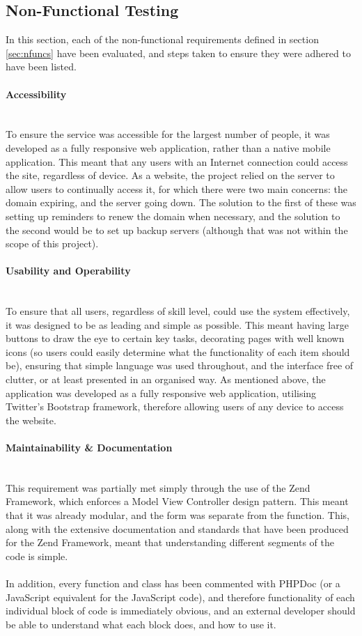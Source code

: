 \newpage 
\subsection{Non-Functional Testing}
In this section, each of the non-functional requirements defined in section \ref{sec:nfuncs} have been evaluated, and steps taken to ensure they were adhered to have been listed.


\paragraph{Accessibility}\ \\
To ensure the service was accessible for the largest number of people, it was developed as a fully responsive web application, rather than a native mobile application. This meant that any users with an Internet connection could access the site, regardless of device. As a website, the project relied on the server to allow users to continually access it, for which there were two main concerns: the domain expiring, and the server going down. The solution to the first of these was setting up reminders to renew the domain when necessary, and the solution to the second would be to set up backup servers (although that was not within the scope of this project).

\paragraph{Usability and Operability}\ \\
To ensure that all users, regardless of skill level, could use the system effectively, it was designed to be as leading and simple as possible. This meant having large buttons to draw the eye to certain key tasks, decorating pages with well known icons (so users could easily determine what the functionality of each item should be), ensuring that simple language was used throughout, and the interface free of clutter, or at least presented in an organised way. As mentioned above, the application was developed as a fully responsive web application, utilising Twitter's Bootstrap framework, therefore allowing users of any device to access the website.

\paragraph{Maintainability \& Documentation}\ \\
This requirement was partially met simply through the use of the Zend Framework, which enforces a Model View Controller design pattern. This meant that it was already modular, and the form was separate from the function. This, along with the extensive documentation and standards that have been produced for the Zend Framework, meant that understanding different segments of the code is simple.\ \\
\ \\
In addition, every function and class has been commented with PHPDoc (or a JavaScript equivalent for the JavaScript code), and therefore functionality of each individual block of code is immediately obvious, and an external developer should be able to understand what each block does, and how to use it.


